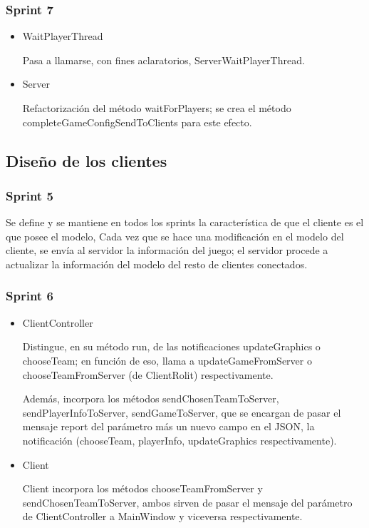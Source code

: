 \documentclass{article}
\theoremstyle{break}
\begin{document}
\subsubsection{Sprint 7}

\begin{itemize}

\item WaitPlayerThread

Pasa a llamarse, con fines aclaratorios, ServerWaitPlayerThread.

\item Server

Refactorización del método waitForPlayers; se crea el método completeGameConfigSendToClients para este efecto.

\end{itemize}

\subsection{Diseño de los clientes}

\subsubsection{Sprint 5}

Se define y se mantiene en todos los sprints la característica de que el cliente es el que posee el modelo, Cada vez que se hace una modificación en el modelo del cliente, se envía al servidor la información del juego; el servidor procede a actualizar la información del modelo del resto de clientes conectados.

\subsubsection{Sprint 6}

\begin{itemize}

\item ClientController

Distingue, en su método run, de las notificaciones updateGraphics o chooseTeam; en función de eso, llama a updateGameFromServer o chooseTeamFromServer (de ClientRolit) respectivamente.

Además, incorpora los métodos sendChosenTeamToServer, sendPlayerInfoToServer, sendGameToServer, que se encargan de pasar el mensaje report del parámetro más un nuevo campo en el JSON, la notificación (chooseTeam, playerInfo, updateGraphics respectivamente).

\item Client

Client incorpora los métodos chooseTeamFromServer y sendChosenTeamToServer, ambos sirven de pasar el mensaje del parámetro de ClientController a MainWindow y viceversa respectivamente.

\end{itemize}
\end{document}
